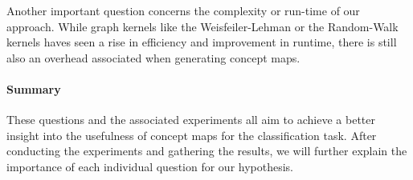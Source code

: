 Another important question concerns the complexity or run-time of our approach.
While graph kernels like the Weisfeiler-Lehman or the Random-Walk kernels haves seen a rise in efficiency and improvement in runtime, there is still also an overhead associated when generating concept maps.

\hspace{2cm}
\paragraph{Summary}
These questions and the associated experiments all aim to achieve a better insight into the usefulness of concept maps for the classification task.
After conducting the experiments and gathering the results, we will further explain the importance of each individual question for our hypothesis.


